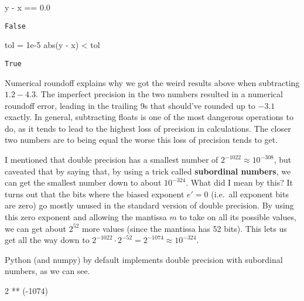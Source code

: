 \documentclass[
  letterpaper,
  DIV=11,
  numbers=noendperiod]{scrreprt}
\newenvironment{Shaded}{\begin{snugshade}}{\end{snugshade}}
\newcommand{\BuiltInTok}[1]{\textcolor[rgb]{0.00,0.23,0.31}{#1}}
\newcommand{\DecValTok}[1]{\textcolor[rgb]{0.68,0.00,0.00}{#1}}
\newcommand{\FloatTok}[1]{\textcolor[rgb]{0.68,0.00,0.00}{#1}}
\newcommand{\NormalTok}[1]{\textcolor[rgb]{0.00,0.23,0.31}{#1}}
\newcommand{\OperatorTok}[1]{\textcolor[rgb]{0.37,0.37,0.37}{#1}}
\begin{document}
\begin{Shaded}
\begin{Highlighting}[]
\NormalTok{y }\OperatorTok{{-}}\NormalTok{ x }\OperatorTok{==} \FloatTok{0.0}
\end{Highlighting}
\end{Shaded}

\begin{verbatim}
False
\end{verbatim}

\begin{Shaded}
\begin{Highlighting}[]
\NormalTok{tol }\OperatorTok{=} \FloatTok{1e{-}5}
\BuiltInTok{abs}\NormalTok{(y }\OperatorTok{{-}}\NormalTok{ x) }\OperatorTok{\textless{}}\NormalTok{ tol}
\end{Highlighting}
\end{Shaded}

\begin{verbatim}
True
\end{verbatim}

Numerical roundoff explains why we got the weird results above when
subtracting \(1.2 - 4.3\). The imperfect precision in the two numbers
resulted in a numerical roundoff error, leading in the trailing \(9\)s
that should've rounded up to \(-3.1\) exactly. In general, subtracting
floats is one of the most dangerous operations to do, as it tends to
lead to the highest loss of precision in calculations. The closer two
numbers are to being equal the worse this loss of precision tends to
get.

I mentioned that double precision has a smallest number of
\(2^{-1022} \approx 10^{-308}\), but caveated that by saying that, by
using a trick called \textbf{subordinal numbers}, we can get the
smallest number down to about \(10^{-324}\). What did I mean by this? It
turns out that the bits where the biased exponent \(e'=0\) (i.e.~all
exponent bits are zero) go mostly unused in the standard version of
double precision. By using this zero exponent and allowing the mantissa
\(m\) to take on all its possible values, we can get about \(2^{52}\)
more values (since the mantissa has 52 bits). This lets us get all the
way down to \(2^{-1022} \cdot 2^{-52} = 2^{-1074} \approx 10^{-324}\).

Python (and numpy) by default implements double precision with
subordinal numbers, as we can see.

\begin{Shaded}
\begin{Highlighting}[]
\DecValTok{2} \OperatorTok{**}\NormalTok{ (}\OperatorTok{{-}}\DecValTok{1074}\NormalTok{)}
\end{Highlighting}
\end{Shaded}
\end{document}
